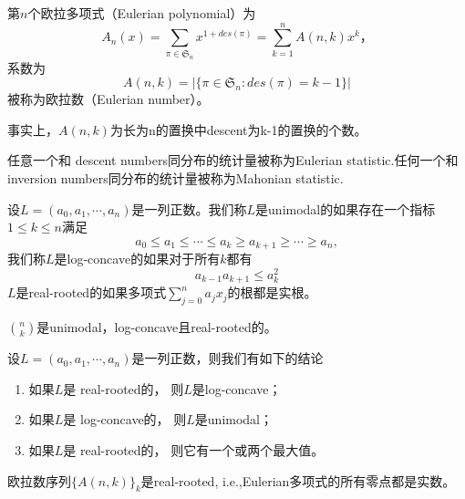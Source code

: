 \begin{definition}
	第$n$个欧拉多项式（Eulerian polynomial）为
	\begin{equation*}
		A_n(x) = \sum\limits_{\pi\in \mathfrak S_n}x^{1+des(\pi)} = \sum\limits_{k=1}^nA(n, k)x^k，
	\end{equation*}
	系数为
	\begin{equation*}
		A(n, k) = |\{\pi\in\mathfrak S_n : des(\pi) = k-1\}|
	\end{equation*}
	被称为欧拉数（Eulerian number）。
\end{definition}
\begin{note}
	事实上，$A(n, k)$为长为n的置换中descent为k-1的置换的个数。
\end{note}
\begin{definition}
	任意一个和
descent numbers同分布的统计量被称为Eulerian statistic.任何一个和 inversion numbers同分布的统计量被称为Mahonian statistic.
\end{definition}
\begin{definition}
	设$L = (a_0, a_1, \cdots, a_n)$是一列正数。我们称$L$是unimodal的如果存在一个指标$1\leq k\leq n$满足
	\begin{equation*}
		a_0\leq a_1\leq \cdots \leq a_k \geq a_{k+1}\geq \cdots \geq a_n,
	\end{equation*}
	我们称$L$是log-concave的如果对于所有$k$都有
	\begin{equation*}
		a_{k-1}a_{k+1}\leq a_k^2
	\end{equation*}
	$L$是real-rooted的如果多项式$\sum\limits_{j=0}^na_jx_j$的根都是实根。
\end{definition}
\begin{example}
	$\binom{n}{k}$是unimodal，log-concave且real-rooted的。
\end{example}
\begin{theorem}
	设$L = (a_0, a_1, \cdots, a_n)$是一列正数，则我们有如下的结论
	\begin{enumerate}
		\item 如果$L$是 real-rooted的， 则$L$是log-concave；
		\item 如果$L$是 log-concave的， 则$L$是unimodal；
		\item 如果$L$是 real-rooted的， 则它有一个或两个最大值。
	\end{enumerate}
\end{theorem}
\begin{theorem}
	 欧拉数序列$\{A(n, k)\}_k$是real-rooted, i.e.,Eulerian多项式的所有零点都是实数。
\end{theorem}
